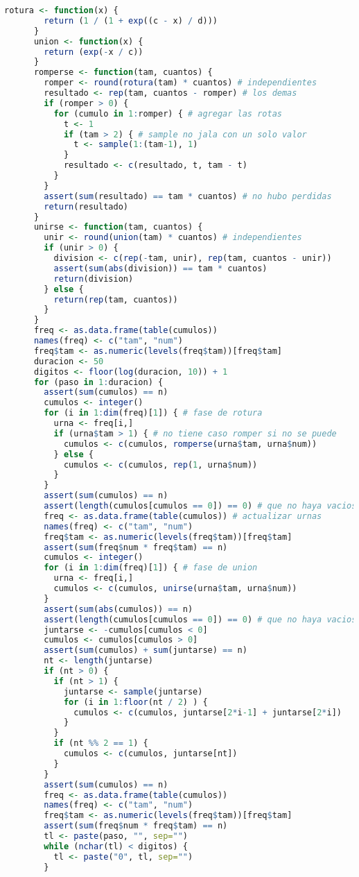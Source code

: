 \documentclass{article}
\begin{document}
\begin{lstlisting}[language=R, caption= Código para graficar el porcentaje de filtrado en cada iteración.]
      rotura <- function(x) {
        return (1 / (1 + exp((c - x) / d)))
      }
      union <- function(x) {
        return (exp(-x / c))
      }
      romperse <- function(tam, cuantos) {
        romper <- round(rotura(tam) * cuantos) # independientes
        resultado <- rep(tam, cuantos - romper) # los demas
        if (romper > 0) {
          for (cumulo in 1:romper) { # agregar las rotas
            t <- 1
            if (tam > 2) { # sample no jala con un solo valor
              t <- sample(1:(tam-1), 1)
            }
            resultado <- c(resultado, t, tam - t)
          }
        }
        assert(sum(resultado) == tam * cuantos) # no hubo perdidas
        return(resultado)
      }
      unirse <- function(tam, cuantos) {
        unir <- round(union(tam) * cuantos) # independientes
        if (unir > 0) {
          division <- c(rep(-tam, unir), rep(tam, cuantos - unir))
          assert(sum(abs(division)) == tam * cuantos)
          return(division)
        } else {
          return(rep(tam, cuantos))
        }
      }
      freq <- as.data.frame(table(cumulos))
      names(freq) <- c("tam", "num")
      freq$tam <- as.numeric(levels(freq$tam))[freq$tam]
      duracion <- 50
      digitos <- floor(log(duracion, 10)) + 1
      for (paso in 1:duracion) {
        assert(sum(cumulos) == n)
        cumulos <- integer()
        for (i in 1:dim(freq)[1]) { # fase de rotura
          urna <- freq[i,]
          if (urna$tam > 1) { # no tiene caso romper si no se puede
            cumulos <- c(cumulos, romperse(urna$tam, urna$num))
          } else {
            cumulos <- c(cumulos, rep(1, urna$num))
          }
        }
        assert(sum(cumulos) == n)
        assert(length(cumulos[cumulos == 0]) == 0) # que no haya vacios
        freq <- as.data.frame(table(cumulos)) # actualizar urnas
        names(freq) <- c("tam", "num")
        freq$tam <- as.numeric(levels(freq$tam))[freq$tam]
        assert(sum(freq$num * freq$tam) == n)
        cumulos <- integer()
        for (i in 1:dim(freq)[1]) { # fase de union
          urna <- freq[i,]
          cumulos <- c(cumulos, unirse(urna$tam, urna$num))
        }
        assert(sum(abs(cumulos)) == n)
        assert(length(cumulos[cumulos == 0]) == 0) # que no haya vacios
        juntarse <- -cumulos[cumulos < 0]
        cumulos <- cumulos[cumulos > 0]
        assert(sum(cumulos) + sum(juntarse) == n)
        nt <- length(juntarse)
        if (nt > 0) {
          if (nt > 1) {
            juntarse <- sample(juntarse)
            for (i in 1:floor(nt / 2) ) {
              cumulos <- c(cumulos, juntarse[2*i-1] + juntarse[2*i])
            }
          }
          if (nt %% 2 == 1) {
            cumulos <- c(cumulos, juntarse[nt])
          }
        }
        assert(sum(cumulos) == n)
        freq <- as.data.frame(table(cumulos))
        names(freq) <- c("tam", "num")
        freq$tam <- as.numeric(levels(freq$tam))[freq$tam]
        assert(sum(freq$num * freq$tam) == n)
        tl <- paste(paso, "", sep="")
        while (nchar(tl) < digitos) {
          tl <- paste("0", tl, sep="")
        }


\end{lstlisting}
\end{document}
